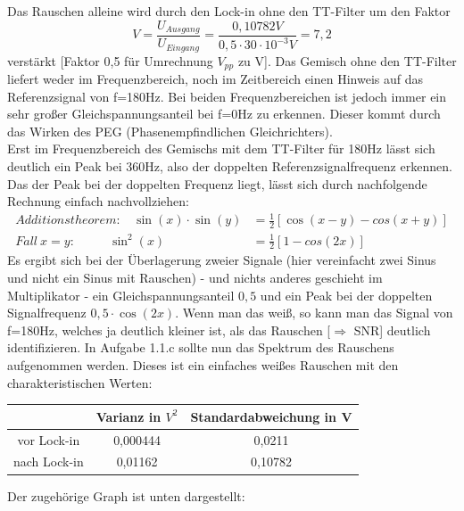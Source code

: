 \documentclass{scrartcl}						%
\begin{document}
			\flushleft
			Das Rauschen alleine wird durch den Lock-in ohne den TT-Filter um den Faktor 
			\begin{equation*}
			 V=\frac{U_{Ausgang}}{U_{Eingang}}= \frac{0,10782 V }{0,5\cdot 30\cdot 10^{-3}V}=7,2
			\end{equation*} verstärkt [Faktor 0,5 für Umrechnung $ V_{pp} $ zu V].
			Das Gemisch ohne den TT-Filter liefert weder im Frequenzbereich, noch im Zeitbereich einen Hinweis auf das Referenzsignal von f=180Hz. Bei beiden Frequenzbereichen ist jedoch immer ein sehr großer Gleichspannungsanteil bei f=0Hz zu erkennen. Dieser kommt durch das Wirken des PEG (Phasenempfindlichen Gleichrichters).\\
			Erst im Frequenzbereich des Gemischs mit dem TT-Filter für 180Hz lässt sich deutlich ein Peak bei 360Hz, also der doppelten Referenzsignalfrequenz erkennen. Das der Peak bei der doppelten Frequenz liegt, lässt sich durch nachfolgende Rechnung einfach nachvollziehen:
			\begin{align*}
				Additionstheorem: \ \ \ \ \sin (x) \cdot \sin(y)&=\frac{1}{2}\left[\cos (x-y)-cos(x+y) \right] \\
				Fall \ x=y: \ \ \ \ \ \ \ \ \ \ \ \ \sin^2(x)&=\frac{1}{2}\left[1-cos(2x) \right]
			\end{align*}
			Es ergibt sich bei der Überlagerung zweier Signale (hier vereinfacht zwei Sinus und nicht ein Sinus mit Rauschen) - und nichts anderes geschieht im Multiplikator - ein Gleichspannungsanteil $ 0,5 $ und ein Peak bei der doppelten Signalfrequenz $ 0,5\cdot \cos(2x)$.
			Wenn man das weiß, so kann man das Signal von f=180Hz, welches ja deutlich kleiner ist, als das Rauschen [$ \Longrightarrow $ SNR] deutlich identifizieren.
			\newline
			In Aufgabe 1.1.c sollte nun das Spektrum des Rauschens aufgenommen werden.  Dieses ist ein einfaches weißes Rauschen mit den charakteristischen Werten:
			\center
			\begin{tabular}{|c|c|c|}
			\hline  & Varianz in $V^2$ & Standardabweichung in V \\ 
			\hline vor Lock-in & 0,000444 & 0,0211 \\ 
			\hline nach Lock-in & 0,01162 & 0,10782 \\ 
			\hline 
			\end{tabular} 
			\flushleft 
			Der zugehörige Graph ist unten dargestellt: \newline
		
\end{document}
